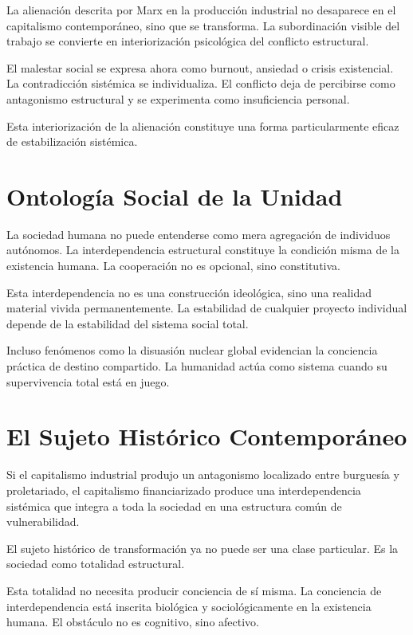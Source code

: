 \documentclass[12pt,a4paper]{article}
\begin{document}
La alienación descrita por Marx en la producción industrial no desaparece en el capitalismo contemporáneo, sino que se transforma. La subordinación visible del trabajo se convierte en interiorización psicológica del conflicto estructural.

El malestar social se expresa ahora como burnout, ansiedad o crisis existencial. La contradicción sistémica se individualiza. El conflicto deja de percibirse como antagonismo estructural y se experimenta como insuficiencia personal.

Esta interiorización de la alienación constituye una forma particularmente eficaz de estabilización sistémica.

\section{Ontología Social de la Unidad}

La sociedad humana no puede entenderse como mera agregación de individuos autónomos. La interdependencia estructural constituye la condición misma de la existencia humana. La cooperación no es opcional, sino constitutiva.

Esta interdependencia no es una construcción ideológica, sino una realidad material vivida permanentemente. La estabilidad de cualquier proyecto individual depende de la estabilidad del sistema social total.

Incluso fenómenos como la disuasión nuclear global evidencian la conciencia práctica de destino compartido. La humanidad actúa como sistema cuando su supervivencia total está en juego.

\section{El Sujeto Histórico Contemporáneo}

Si el capitalismo industrial produjo un antagonismo localizado entre burguesía y proletariado, el capitalismo financiarizado produce una interdependencia sistémica que integra a toda la sociedad en una estructura común de vulnerabilidad.

El sujeto histórico de transformación ya no puede ser una clase particular. Es la sociedad como totalidad estructural.

Esta totalidad no necesita producir conciencia de sí misma. La conciencia de interdependencia está inscrita biológica y sociológicamente en la existencia humana. El obstáculo no es cognitivo, sino afectivo.
\end{document}
